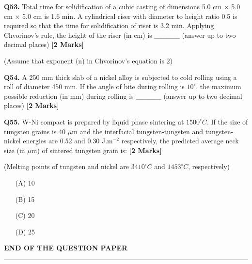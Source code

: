 \documentclass[11pt]{article}
\newcommand{\questionb}[2]{
    \noindent\textbf{Q#2.} #1 \hfill \textbf{[2 Marks]}
}
\begin{document}
\questionb{Total time for solidification of a cubic casting of dimensions 5.0 cm × 5.0 cm × 5.0 cm is 1.6 min. A cylindrical riser with diameter to height ratio 0.5 is required so that the time for solidification of riser is 3.2 min. Applying Chvorinov's rule, the height of the riser (in cm) is \_\_\_\_\_ (answer up to two decimal places)}{53}
(Assume that exponent (n) in Chvorinov's equation is 2)
\vspace{0.5cm}

\questionb{A 250 mm thick slab of a nickel alloy is subjected to cold rolling using a roll of diameter 450 mm. If the angle of bite during rolling is \( 10^\circ \), the maximum possible reduction (in mm) during rolling is \_\_\_\_\_ (answer up to two decimal places)}{54}
\vspace{0.5cm}

\questionb{W-Ni compact is prepared by liquid phase sintering at \( 1500^\circ C \). If the size of tungsten grains is 40 \(\mu\)m and the interfacial tungsten-tungsten and tungsten-nickel energies are 0.52 and 0.30 J.m\(^{-2}\) respectively, the predicted average neck size (in \(\mu\)m) of sintered tungsten grain is:}{55}
(Melting points of tungsten and nickel are \( 3410^\circ C \) and \( 1453^\circ C \), respectively)
\begin{enumerate}
    \item[(A)] 10
    \item[(B)] 15
    \item[(C)] 20
    \item[(D)] 25
\end{enumerate}
\vspace{0.5cm}

\vspace{1cm}
\begin{center}
\textbf{END OF THE QUESTION PAPER} \\
\rule{\textwidth}{0.5pt}
\end{center}
\end{document}
